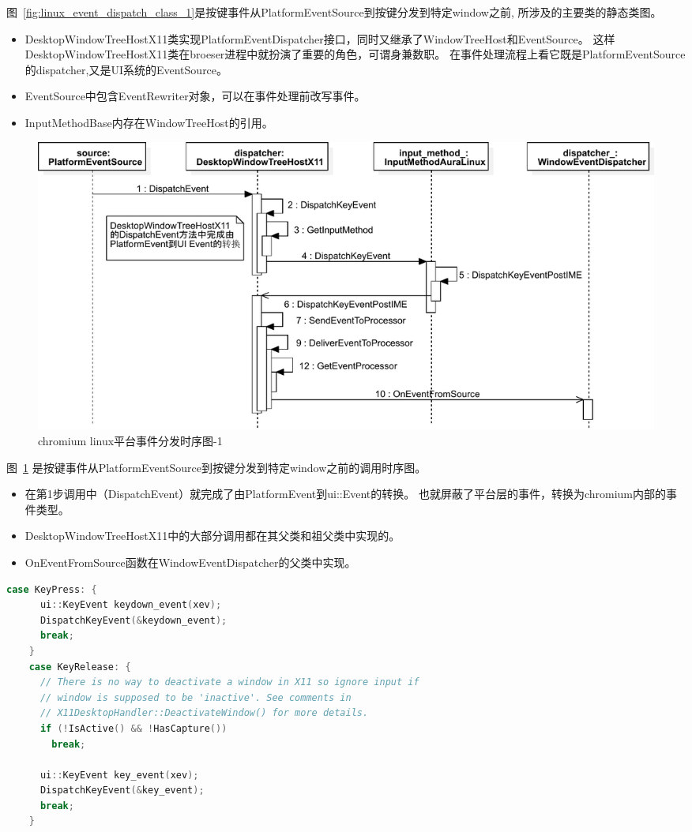 \documentclass[12pt]{article}
\begin{document}
图~\ref{fig:linux_event_dispatch_class_1}是按键事件从PlatformEventSource到按键分发到特定window之前,
所涉及的主要类的静态类图。
\begin{itemize}
  \item DesktopWindowTreeHostX11类实现PlatformEventDispatcher接口，同时又继承了WindowTreeHost和EventSource。
  这样DesktopWindowTreeHostX11类在broeser进程中就扮演了重要的角色，可谓身兼数职。
  在事件处理流程上看它既是PlatformEventSource的dispatcher,又是UI系统的EventSource。
  \item EventSource中包含EventRewriter对象，可以在事件处理前改写事件。
  \item InputMethodBase内存在WindowTreeHost的引用。
\end{itemize}

\begin{figure}[H] 
  \centering 
  \includegraphics[width=\textwidth]{image/linux_event_dispatch_sequence_1.pdf} 
  \caption{chromium linux平台事件分发时序图-1} \label{fig:linux_event_dispatch_sequence_1} 
\end{figure}

图~\ref{fig:linux_event_dispatch_sequence_1}
是按键事件从PlatformEventSource到按键分发到特定window之前的调用时序图。

\begin{itemize}
  \item 在第1步调用中（DispatchEvent）就完成了由PlatformEvent到ui::Event的转换。
  也就屏蔽了平台层的事件，转换为chromium内部的事件类型。
  \item DesktopWindowTreeHostX11中的大部分调用都在其父类和祖父类中实现的。
  \item OnEventFromSource函数在WindowEventDispatcher的父类中实现。
\end{itemize}

\begin{spacing}{1.0}
\begin{lstlisting}[language={C++}]
    case KeyPress: {
      ui::KeyEvent keydown_event(xev);
      DispatchKeyEvent(&keydown_event);
      break;
    }
    case KeyRelease: {
      // There is no way to deactivate a window in X11 so ignore input if
      // window is supposed to be 'inactive'. See comments in
      // X11DesktopHandler::DeactivateWindow() for more details.
      if (!IsActive() && !HasCapture())
        break;

      ui::KeyEvent key_event(xev);
      DispatchKeyEvent(&key_event);
      break;
    }
\end{lstlisting}
\end{spacing}
\end{document}
